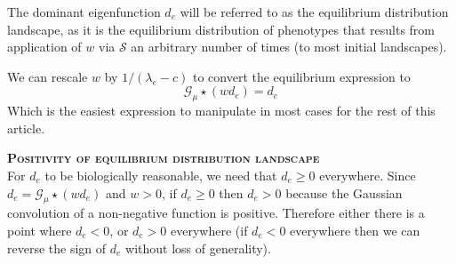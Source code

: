 \documentclass{article}
\begin{document}
The dominant eigenfunction $d_e$ will be referred to as the equilibrium distribution landscape, as it is the equilibrium distribution of phenotypes that results from application of $w$ via $\mathcal S$ an arbitrary number of times (to most initial landscapes).

We can rescale $w$ by $1/(\lambda_e-c)$ to convert the equilibrium expression to
$$\mathcal G_\mu\star(wd_e)=d_e$$
Which is the easiest expression to manipulate in most cases for the rest of this article.







\bigskip\noindent\textbf{\textsc{Positivity of equilibrium distribution landscape}}\\
For $d_e$ to be biologically reasonable, we need that $d_e\ge0$ everywhere. Since $d_e=\mathcal G_\mu\star(wd_e)$ and $w>0$, if $d_e\ge0$ then $d_e>0$ because the Gaussian convolution of a non-negative function is positive. Therefore either there is a point where $d_e<0$, or $d_e>0$ everywhere (if $d_e<0$ everywhere then we can reverse the sign of $d_e$ without loss of generality).
\end{document}
